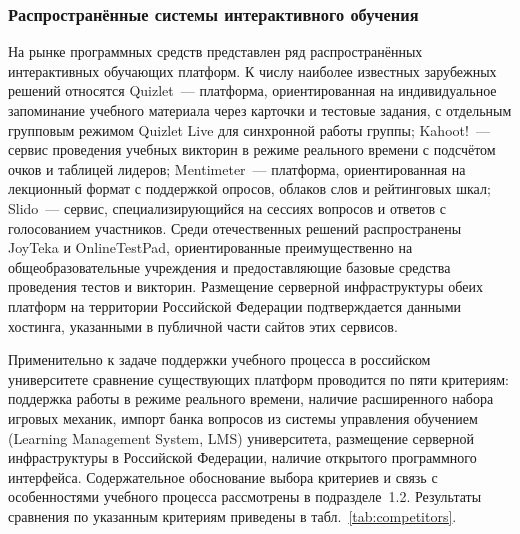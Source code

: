 \subsubsection{Распространённые системы интерактивного обучения}

На рынке программных средств представлен ряд распространённых
интерактивных обучающих платформ. К числу наиболее известных
зарубежных решений относятся Quizlet~--- платформа, ориентированная
на индивидуальное запоминание учебного материала через карточки
и тестовые задания, с отдельным групповым режимом Quizlet Live
для синхронной работы группы; Kahoot!~--- сервис проведения учебных викторин
в режиме реального времени с подсчётом очков и таблицей лидеров;
Mentimeter~--- платформа, ориентированная на лекционный формат
с поддержкой опросов, облаков слов и рейтинговых шкал;
Slido~--- сервис, специализирующийся на сессиях вопросов и ответов
с голосованием участников. Среди отечественных решений распространены
JoyTeka и OnlineTestPad, ориентированные преимущественно
на общеобразовательные учреждения и предоставляющие базовые
средства проведения тестов и викторин. Размещение серверной
инфраструктуры обеих платформ на территории Российской Федерации
подтверждается данными хостинга, указанными в публичной части
сайтов этих сервисов.

Применительно к задаче поддержки учебного процесса в российском
университете сравнение существующих платформ проводится по пяти критериям:
поддержка работы в режиме реального времени, наличие расширенного
набора игровых механик, импорт банка вопросов из системы управления
обучением (Learning Management System, LMS) университета,
размещение серверной инфраструктуры в Российской Федерации, наличие
открытого программного интерфейса. Содержательное обоснование
выбора критериев и связь с особенностями учебного процесса
рассмотрены в подразделе~1.2. Результаты сравнения по указанным
критериям приведены в табл.~\ref{tab:competitors}.


